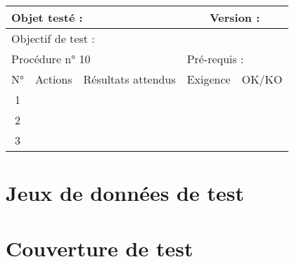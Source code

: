 \documentclass{../res/univ-projet}
\begin{document}
\begin{center}
    \begin{tabular}{|c|p{5cm}|p{5cm}|p{1.5cm}|p{1.5cm}|}
      \hline
      \multicolumn{3}{|l|}{Objet testé : } & \multicolumn{2}{c|}{Version : }\\ \hline
      \multicolumn{5}{|l|}{Objectif de test : }\\ \hline
      \multicolumn{3}{|l|}{Procédure n° 10} & \multicolumn{2}{p{3cm}|}{Pré-requis : }\\ \hline
      \multicolumn{1}{|c|}{N°} & \multicolumn{1}{c|}{Actions} & \multicolumn{1}{c|}{Résultats attendus} & 
      \multicolumn{1}{c|}{Exigence} & \multicolumn{1}{c|}{OK/KO}\\ \hline
      1 &  &  &  & \\
      2 &  &  &  & \\
      3 &  &  &  & \\ \hline
    \end{tabular}
    \vfill



\end{center}

\section{Jeux de données de test}

\section{Couverture de test}
\end{document}

